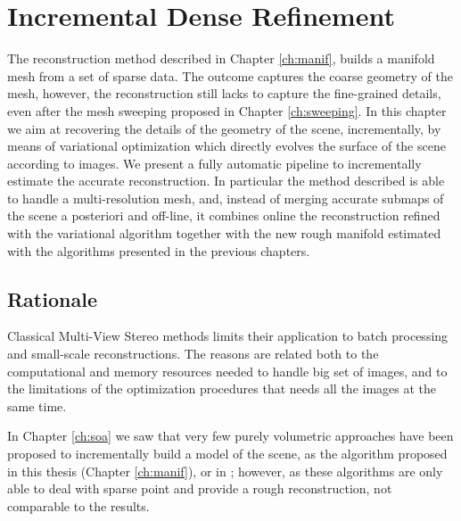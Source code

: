 \chapter[Incremental Dense Refinement]{Incremental Dense Refinement}
\label{ch:incrDenseRef}

The reconstruction method described in Chapter \ref{ch:manif}, builds a manifold mesh from a set of sparse data. 
The outcome captures the coarse geometry of the mesh, however, the reconstruction still lacks to capture the fine-grained details, even after the mesh sweeping proposed in Chapter \ref{ch:sweeping}.
In this chapter we aim at recovering the details of the geometry of the scene, incrementally, by means of variational optimization which directly evolves the surface of the scene according to images. 
We present a fully automatic pipeline to incrementally estimate the accurate reconstruction. 
In particular the method described is able to handle a multi-resolution mesh, and, instead of merging accurate submaps of the scene a posteriori and off-line, it combines online the reconstruction refined with the variational algorithm together with the new rough manifold estimated with the algorithms presented in the previous chapters.

\minitoc
\newpage

\section{Rationale}

Classical Multi-View Stereo methods \cite{gargallo2005bayesian,delaunoy_et_al_08} limits their application to batch processing and small-scale reconstructions.
The reasons are related both to the computational and memory resources needed to handle big set of images, and to the limitations of the optimization procedures that needs all the images at the same time.

In Chapter \ref{ch:soa} we saw that very few purely volumetric approaches have been proposed to incrementally build a model of the scene, as the algorithm proposed in this thesis (Chapter \ref{ch:manif}), or in \cite{lovi_et_al_11,hoppe2013incremental,litvinov_lhuillier_13}; however, as these algorithms are  only able to deal with sparse point and provide a rough reconstruction, not comparable to the \mvs results.

